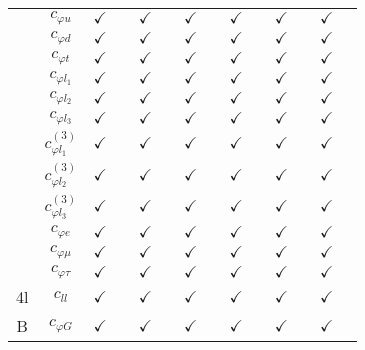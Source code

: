\documentclass{article}
\begin{document}
\begin{table}[H]
\begin{tabular}{|c|c|c|c|c|c|c|c|c|c|c|c|c|c|}
 & $c_{\varphi u}$ & $\checkmark$ &  & $\checkmark$ &  & $\checkmark$ &  & $\checkmark$ &  & $\checkmark$ &  & $\checkmark$ & \\ \cline{2-14}
 & $c_{\varphi d}$ & $\checkmark$ &  & $\checkmark$ &  & $\checkmark$ &  & $\checkmark$ &  & $\checkmark$ &  & $\checkmark$ & \\ \cline{2-14}
 & $c_{\varphi t}$ & $\checkmark$ &  & $\checkmark$ &  & $\checkmark$ &  & $\checkmark$ &  & $\checkmark$ &  & $\checkmark$ & \\ \cline{2-14}
 & $c_{\varphi l_1}$ & $\checkmark$ &  & $\checkmark$ &  & $\checkmark$ &  & $\checkmark$ &  & $\checkmark$ &  & $\checkmark$ & \\ \cline{2-14}
 & $c_{\varphi l_2}$ & $\checkmark$ &  & $\checkmark$ &  & $\checkmark$ &  & $\checkmark$ &  & $\checkmark$ &  & $\checkmark$ & \\ \cline{2-14}
 & $c_{\varphi l_3}$ & $\checkmark$ &  & $\checkmark$ &  & $\checkmark$ &  & $\checkmark$ &  & $\checkmark$ &  & $\checkmark$ & \\ \cline{2-14}
 & $c_{\varphi l_1}^{(3)}$ & $\checkmark$ &  & $\checkmark$ &  & $\checkmark$ &  & $\checkmark$ &  & $\checkmark$ &  & $\checkmark$ & \\ \cline{2-14}
 & $c_{\varphi l_2}^{(3)}$ & $\checkmark$ &  & $\checkmark$ &  & $\checkmark$ &  & $\checkmark$ &  & $\checkmark$ &  & $\checkmark$ & \\ \cline{2-14}
 & $c_{\varphi l_3}^{(3)}$ & $\checkmark$ &  & $\checkmark$ &  & $\checkmark$ &  & $\checkmark$ &  & $\checkmark$ &  & $\checkmark$ & \\ \cline{2-14}
 & $c_{\varphi e}$ & $\checkmark$ &  & $\checkmark$ &  & $\checkmark$ &  & $\checkmark$ &  & $\checkmark$ &  & $\checkmark$ & \\ \cline{2-14}
 & $c_{\varphi \mu}$ & $\checkmark$ &  & $\checkmark$ &  & $\checkmark$ &  & $\checkmark$ &  & $\checkmark$ &  & $\checkmark$ & \\ \cline{2-14}
 & $c_{\varphi \tau}$ & $\checkmark$ &  & $\checkmark$ &  & $\checkmark$ &  & $\checkmark$ &  & $\checkmark$ &  & $\checkmark$ &
\\ \hline
\multirow{1}{*}{4l}
 & $c_{ll}$ & $\checkmark$ &  & $\checkmark$ &  & $\checkmark$ &  & $\checkmark$ &  & $\checkmark$ &  & $\checkmark$ &
\\ \hline
\multirow{7}{*}{B}
 & $c_{\varphi G}$ & $\checkmark$ &  & $\checkmark$ &  & $\checkmark$ &  & $\checkmark$ &  & $\checkmark$ &  & $\checkmark$ & \\ \cline{2-14}

\end{tabular}
\end{table}
\end{document}
